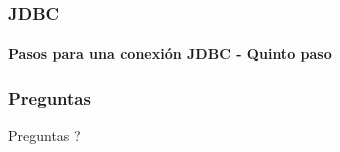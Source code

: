 \documentclass{beamer}
\begin{document}
    \begin{frame}
		\frametitle{JDBC}
		\framesubtitle{Pasos para una conexi\'on JDBC - Quinto paso}

               
	\end{frame}			
	
    \begin{frame}
		\frametitle{Preguntas}

		\hspace{4cm}\huge{Preguntas ?}
		
	\end{frame}
	
\end{document}
